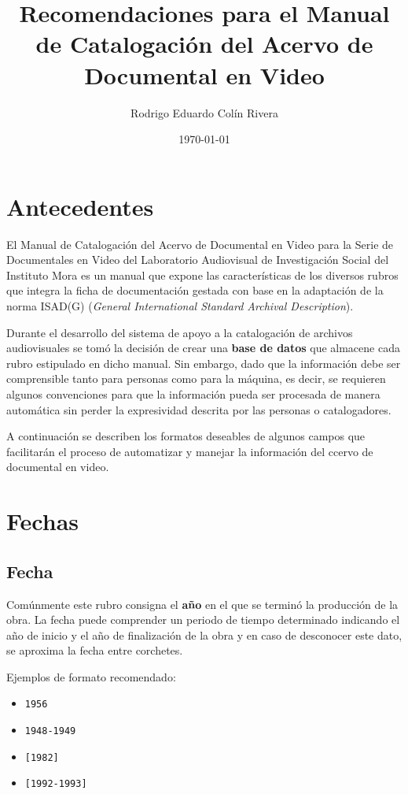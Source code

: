 \documentclass[10pt,letterpaper]{article}
\begin{document}
\title{Recomendaciones para el Manual de Catalogación del Acervo de Documental en Video}
\author{Rodrigo Eduardo Colín Rivera}
\date{\today}
\maketitle

\setcounter{secnumdepth}{0} %
\setcounter{tocdepth}{0} %

\section{Antecedentes}
El Manual de Catalogación del Acervo de Documental en Video para la Serie de Documentales en Video del Laboratorio Audiovisual de Investigación Social del Instituto Mora es un manual que expone las características de los diversos rubros que integra la ficha de documentación gestada con base en la adaptación de la norma ISAD(G) (\textit{General International Standard Archival Description}).

Durante el desarrollo del sistema de apoyo a la catalogación de archivos audiovisuales se tomó la decisión de crear una \textbf{base de datos} que almacene cada rubro estipulado en dicho manual. Sin embargo, dado que la información debe ser comprensible tanto para personas como para la máquina, es decir, se requieren algunos convenciones para que la información pueda ser procesada de manera automática sin perder la expresividad descrita por las personas o catalogadores.

A continuación se describen los formatos deseables de algunos campos que facilitarán el proceso de automatizar y manejar la información del ccervo de documental en video.

\section{Fechas}

\subsection{Fecha}
Comúnmente este rubro consigna el \textbf{año} en el que se terminó la producción de la obra. La fecha puede comprender un periodo de tiempo determinado indicando el año de inicio y el año de finalización de la obra y en caso de desconocer este dato, se aproxima la fecha entre corchetes. 

Ejemplos de formato recomendado:
{\color{Blue}
\begin{itemize}
	\item \texttt{1956}
	\item \texttt{1948-1949}
	\item \texttt{[1982]}
	\item \texttt{[1992-1993]}
\end{itemize}
}
\end{document}
